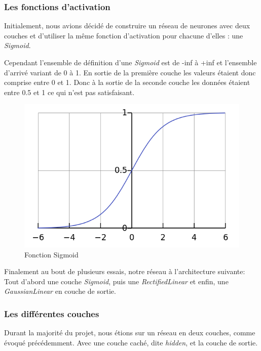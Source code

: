 \documentclass[12pt, a4paper]{article}
\begin{document}
	\subsubsection{Les fonctions d'activation}
Initialement, nous avions décidé de construire un réseau de neurones avec deux couches et d'utiliser la même fonction d'activation pour chacune d'elles : une \emph{Sigmoid}.

Cependant l'ensemble de définition d'une \emph{Sigmoid} est de -inf à +inf et l'ensemble d'arrivé variant de 0 à 1. En sortie de la première couche les valeurs étaient donc comprise entre 0 et 1. Donc à la sortie de la seconde couche les données étaient entre 0.5 et 1 ce qui n'est pas satisfaisant. 

\begin{figure}[h!]
  \centering
  \includegraphics[scale=0.4]{Images/sigmoid.png}
  \caption{Fonction Sigmoid}
\end{figure}

Finalement au bout de plusieurs essais, notre réseau à l'architecture suivante:
Tout d'abord une couche \emph{Sigmoid}, puis une \emph{ RectifiedLinear} et enfin, une \emph{GaussianLinear} en couche de sortie.

	\subsubsection{Les différentes couches}
	
Durant la majorité du projet, nous étions sur un réseau en deux couches, comme évoqué précédemment. Avec une couche caché, dite \emph{hidden}, et la couche de sortie. 
\end{document}

